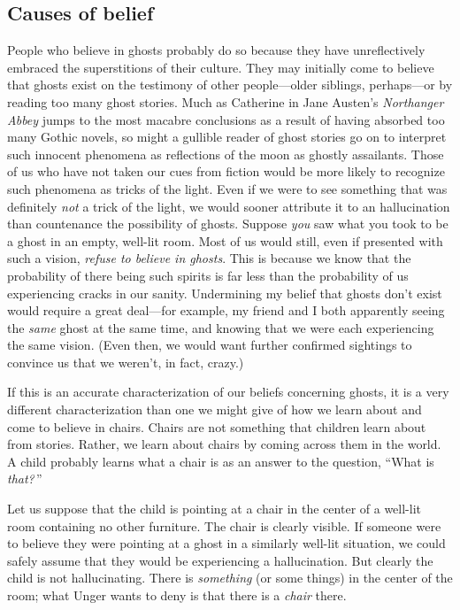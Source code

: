 \documentclass[11pt]{standalone} \newif\ifstandlone \standalonetrue
\begin{document}
\begin{spacing}{1.5}
\subsection{Causes of belief}
\label{unger-cause}
People who believe in ghosts probably do so because they have
unreflectively embraced the superstitions of their culture.  They may
initially come to believe that ghosts exist on the testimony of other
people---older siblings, perhaps---or by reading too many ghost
stories.  Much as Catherine in Jane Austen's {\em Northanger Abbey}
jumps to the most macabre conclusions as a result of having absorbed
too many Gothic novels, so might a gullible reader of ghost stories go
on to interpret such innocent phenomena as reflections of the moon as
ghostly assailants.  Those of us who have not taken our cues from
fiction would be more likely to recognize such phenomena as tricks of
the light.  Even if we were to see something that was definitely {\em
  not} a trick of the light, we would sooner attribute it to an
hallucination than countenance the possibility of ghosts.  Suppose
{\em you} saw what you took to be a ghost in an empty, well-lit room.
Most of us would still, even if presented with such a vision, {\em
  refuse to believe in ghosts}.  This is because we know that the
probability of there being such spirits is far less than the
probability of us experiencing cracks in our sanity.  Undermining my
belief that ghosts don't exist would require a great deal---for
example, my friend and I both apparently seeing the {\em same} ghost
at the same time, and knowing that we were each experiencing the same
vision.  (Even then, we would want further confirmed sightings to
convince us that we weren't, in fact, crazy.)

If this is an accurate characterization of our beliefs concerning
ghosts, it is a very different characterization than one we might give
of how we learn about and come to believe in chairs.  Chairs are not
something that children learn about from stories.  Rather, we learn
about chairs by coming across them in the world.  A child probably
learns what a chair is as an answer to the question, ``What is {\em
  that?}\,''

Let us suppose that the child is pointing at a chair in the center of
a well-lit room containing no other furniture.  The chair is clearly
visible.  If someone were to believe they were pointing at a ghost in
a similarly well-lit situation, we could safely assume that they would
be experiencing a hallucination.  But clearly the child is not
hallucinating.  There is {\em something} (or some things) in the
center of the room; what Unger wants to deny is that there is a {\em
  chair} there.


\end{spacing}
\end{document}
